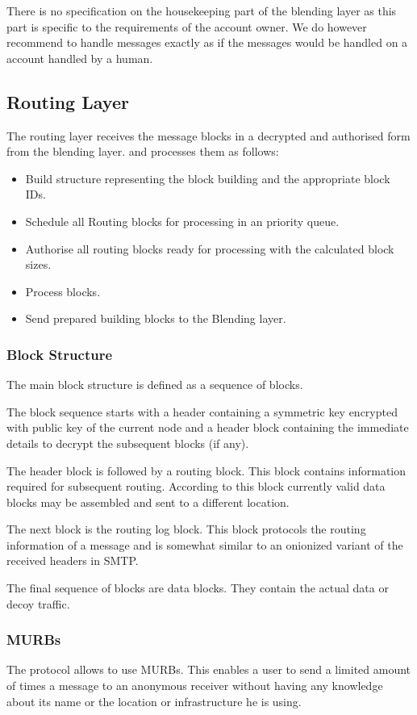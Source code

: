 There is no specification on the housekeeping part of the blending layer as this part is specific to the requirements of the account owner. We do however recommend to handle messages exactly as if the messages would be handled on a account handled by a human. 

\subsection{Routing Layer}
The routing layer receives the message blocks in a decrypted and authorised form from the blending layer. and processes them as follows:

\begin{itemize}
	\item Build structure representing the block building and the appropriate block IDs.
	\item Schedule all Routing blocks for processing in an priority queue.
	\item Authorise all routing blocks ready for processing with the calculated block sizes.
	\item Process blocks.
	\item Send prepared building blocks to the Blending layer.
\end{itemize}

\subsubsection{Block Structure}
The main block structure is defined as a sequence of blocks.

The block sequence starts with a header containing a symmetric key encrypted with public key of the current node and a header block containing the immediate details to decrypt the subsequent blocks (if any).

The header block is followed by a routing block. This block contains information required for subsequent routing. According to this block currently valid data blocks may be assembled and sent to a different location. 

The next block is the routing log block. This block protocols the routing information of a message and is somewhat similar to an onionized variant of the received headers in SMTP.

The final sequence of blocks are data blocks. They contain the actual data or decoy traffic.

\subsubsection{MURBs\label{sec:murb}}
The protocol allows to use MURBs. This enables a user to send a limited amount of times a message to an anonymous receiver without having any knowledge about its name or the location or infrastructure he is using.

